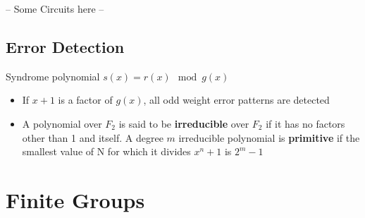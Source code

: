 \documentclass[a4paper]{article}
\theoremstyle{dotless}
\theoremstyle{dotless}
\theoremstyle{remark}
\begin{document}
-- Some Circuits here --

\subsection{Error Detection}
Syndrome polynomial $s(x) = r(x)\mod{g(x)}$
\begin{itemize}
\item If $x + 1$ is a factor of $g(x)$, all odd weight error patterns are detected
\item A polynomial over $F_2$ is said to be \textbf{irreducible} over $F_2$ if it has no factors other than 1 and itself. A degree $m$ irreducible polynomial is \textbf{primitive} if the smallest value of N for which it divides $x^n + 1$ is $2^m -1$
\end{itemize}

\section{Finite Groups}
\end{document}
